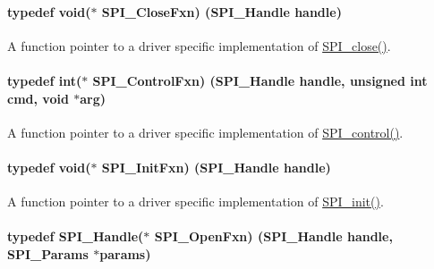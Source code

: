 \paragraph[{S\+P\+I\+\_\+\+Close\+Fxn}]{\setlength{\rightskip}{0pt plus 5cm}typedef void($\ast$ S\+P\+I\+\_\+\+Close\+Fxn) ({\bf S\+P\+I\+\_\+\+Handle} handle)}\label{_s_p_i_8h_aa361d580eb0a5a052d0a1403e0aa5746}


A function pointer to a driver specific implementation of \hyperlink{_s_p_i_8h_a0e3448b30b88609fa120915e49560601}{S\+P\+I\+\_\+close()}. 

\paragraph[{S\+P\+I\+\_\+\+Control\+Fxn}]{\setlength{\rightskip}{0pt plus 5cm}typedef int($\ast$ S\+P\+I\+\_\+\+Control\+Fxn) ({\bf S\+P\+I\+\_\+\+Handle} handle, unsigned int cmd, void $\ast$arg)}\label{_s_p_i_8h_a48e6e65aa93fbcb2fd2c361e6ec25288}


A function pointer to a driver specific implementation of \hyperlink{_s_p_i_8h_ab9d3a23991be2741f382749d3844cc2f}{S\+P\+I\+\_\+control()}. 

\paragraph[{S\+P\+I\+\_\+\+Init\+Fxn}]{\setlength{\rightskip}{0pt plus 5cm}typedef void($\ast$ S\+P\+I\+\_\+\+Init\+Fxn) ({\bf S\+P\+I\+\_\+\+Handle} handle)}\label{_s_p_i_8h_aa3b32db8f017fd0ce92bf46a089659e6}


A function pointer to a driver specific implementation of \hyperlink{_s_p_i_8h_afd9b09f58917f0e2d14c61b956eba214}{S\+P\+I\+\_\+init()}. 

\paragraph[{S\+P\+I\+\_\+\+Open\+Fxn}]{\setlength{\rightskip}{0pt plus 5cm}typedef {\bf S\+P\+I\+\_\+\+Handle}($\ast$ S\+P\+I\+\_\+\+Open\+Fxn) ({\bf S\+P\+I\+\_\+\+Handle} handle, {\bf S\+P\+I\+\_\+\+Params} $\ast$params)}\label{_s_p_i_8h_a7e0786f4c1487f9daec49adbc3ac1cf5}


